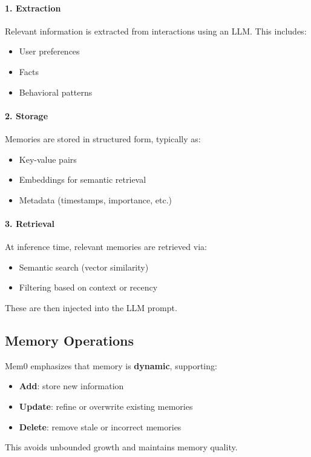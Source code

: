 \documentclass[12pt]{article}
\begin{document}
\paragraph{1. Extraction}
Relevant information is extracted from interactions using an LLM. This includes:
\begin{itemize}
		\item User preferences
		\item Facts
		\item Behavioral patterns
\end{itemize}

\paragraph{2. Storage}
Memories are stored in structured form, typically as:
\begin{itemize}
		\item Key-value pairs
		\item Embeddings for semantic retrieval
		\item Metadata (timestamps, importance, etc.)
\end{itemize}

\paragraph{3. Retrieval}
At inference time, relevant memories are retrieved via:
\begin{itemize}
		\item Semantic search (vector similarity)
		\item Filtering based on context or recency
\end{itemize}
These are then injected into the LLM prompt.

\subsection{Memory Operations}
Mem0 emphasizes that memory is \textbf{dynamic}, supporting:
\begin{itemize}
		\item \textbf{Add}: store new information
		\item \textbf{Update}: refine or overwrite existing memories
		\item \textbf{Delete}: remove stale or incorrect memories
\end{itemize}

This avoids unbounded growth and maintains memory quality.
\end{document}
